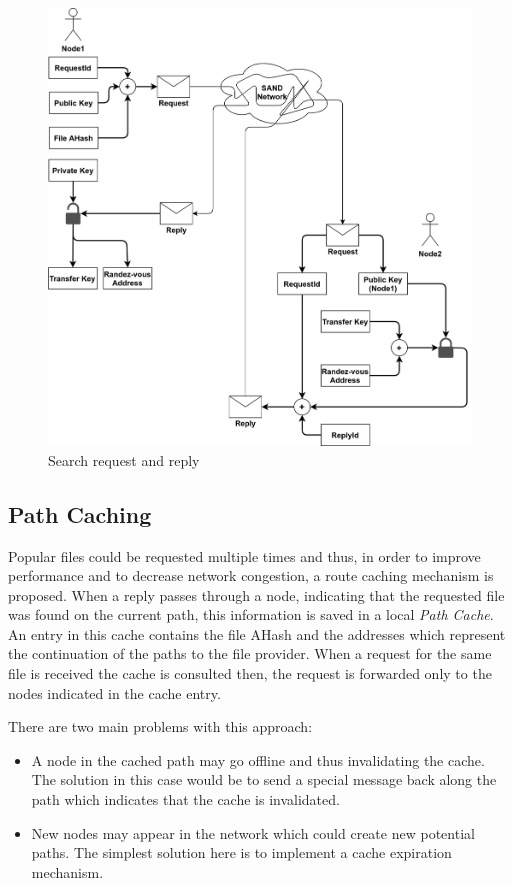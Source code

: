 \begin{figure}
    \centering
    \includegraphics[width=\textwidth]{figures/fig5}
    \caption{Search request and reply}
    \label{fig:fig5}
\end{figure}

\subsection{Path Caching}

Popular files could be requested multiple times and thus, in order to improve 
performance and to decrease network congestion, a route caching mechanism is 
proposed. When a reply passes through a node, indicating that the requested 
file was found on the current path, this information is saved in a local 
\textit{Path Cache}. An entry in this cache contains the file AHash and the 
addresses which represent the continuation of the paths to the file provider. 
When a request for the same file is received the cache is consulted then, the 
request is forwarded only to the nodes indicated in the cache entry.

There are two main problems with this approach:
\begin{itemize}
    \item A node in the cached path may go offline and thus invalidating the 
cache. The solution in this case would be to send a special message back along 
the path which indicates that the cache is invalidated.
    \item New nodes may appear in the network which could create new potential 
paths. The simplest solution here is to implement a cache expiration mechanism.
\end{itemize}

